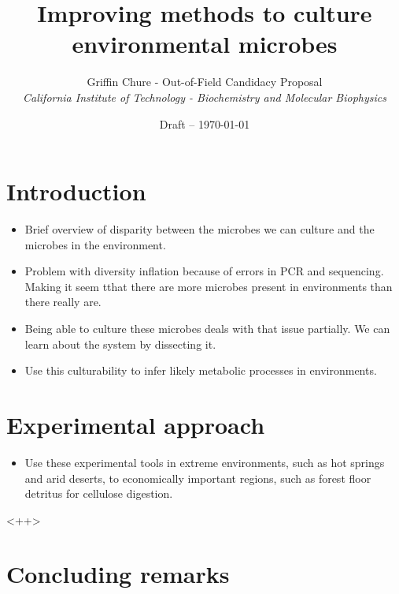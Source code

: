 
\usepackage{blindtext}
\usepackage[english]{babel}

\title{Improving methods to culture environmental microbes}
\author{Griffin Chure - Out-of-Field Candidacy Proposal\\
	\textit{California Institute of Technology - Biochemistry and Molecular
	Biophysics}}
\date{Draft -- \today}



\maketitle
\abstract{\blindtext}

\section*{Introduction}
\begin{itemize}
	\item Brief overview of disparity between the microbes we can culture and the microbes in the environment.
	\item Problem with diversity inflation because of errors in PCR and sequencing. Making it seem tthat there are more microbes present in environments than there really are. 
	\item Being able to culture these microbes deals with that issue partially. We can learn about the system by dissecting it.
	\item Use this culturability to infer likely metabolic processes in environments.

\end{itemize}
\section*{Experimental approach}
\begin{itemize}
	\item Use these experimental tools in extreme environments, such as hot springs and arid deserts, to economically important regions, such as forest floor detritus for cellulose digestion.
\end{itemize}<++>

\section*{Concluding remarks}



